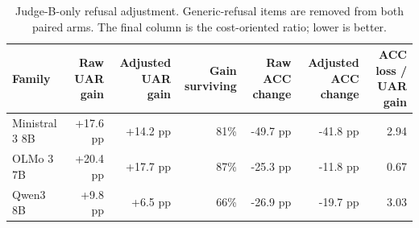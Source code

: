 \begin{table}[t]
\centering
\caption{Judge-B-only refusal adjustment. Generic-refusal items are removed from both paired arms. The final column is the cost-oriented ratio; lower is better.}
\label{tab:adjusted}
\scriptsize
\begin{tabular}{@{}lrrrrrr@{}}
\toprule
\textbf{Family} & \textbf{Raw UAR gain} & \textbf{Adjusted UAR gain} & \textbf{Gain surviving} & \textbf{Raw ACC change} & \textbf{Adjusted ACC change} & \textbf{ACC loss / UAR gain} \\
\midrule
Ministral 3 8B & +17.6 pp & +14.2 pp & 81\% & -49.7 pp & -41.8 pp & 2.94 \\
OLMo 3 7B & +20.4 pp & +17.7 pp & 87\% & -25.3 pp & -11.8 pp & 0.67 \\
Qwen3 8B & +9.8 pp & +6.5 pp & 66\% & -26.9 pp & -19.7 pp & 3.03 \\
\bottomrule
\end{tabular}
\end{table}
